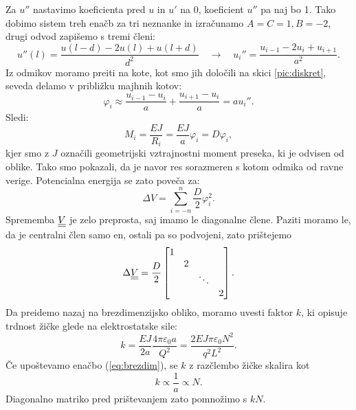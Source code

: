 \documentclass{article}
\begin{document}
Za $u''$ nastavimo koeficienta pred $u$ in $u'$ na 0, koeficient $u''$ pa naj bo 1. Tako dobimo sistem treh enačb za tri neznanke in izračunamo $A=C=1, B=-2$, drugi odvod zapišemo s tremi členi:
\begin{equation}
    u''(l)=\frac{u(l-d)-2u(l)+u(l+d)}{d^2}\quad\rightarrow\quad u_i''=\frac{u_{i-1}-2u_i+u_{i+1}}{a^2}.
\end{equation}
Iz odmikov moramo preiti na kote, kot smo jih določili na skici \ref{pic:diskret}, seveda delamo v približku majhnih kotov:
\begin{equation}
    \varphi_i\approx \frac{u_{i-1}-u_i}{a}+\frac{u_{i+1}-u_i}{a}=au_i''.
    \label{eq:ang_def}
\end{equation}
Sledi:
\begin{equation}
    M_i=\frac{EJ}{R_i}=\frac{EJ}{a}\varphi_i=D\varphi_i,
\end{equation}
kjer smo z $J$ označili geometrijski vztrajnostni moment preseka, ki je odvisen od oblike. Tako smo pokazali, da je navor res sorazmeren s kotom odmika od ravne verige. Potencialna energija se zato poveča za:
\begin{equation}
    \Delta V=\sum_{i=-n}^n\frac{D}{2}\varphi_i^2.
\end{equation}
Sprememba $\underline{\underline{V}}$ je zelo preprosta, saj imamo le diagonalne člene. Paziti moramo le, da je centralni člen samo en, ostali pa so podvojeni, zato prištejemo
\begin{equation}
    \Delta\underline{\underline{V}}=\frac{D}{2}\begin{bmatrix}
        1 & & & \\
        & 2 & & \\
        & & \ddots & \\
        & & & 2
    \end{bmatrix}.
\end{equation}
Da preidemo nazaj na brezdimenzijsko obliko, moramo uvesti faktor $k$, ki opisuje trdnost žičke glede na elektrostatske sile:
\begin{equation}
    k=\frac{EJ}{2a}\frac{4\pi\varepsilon_0a}{Q^2}=\frac{2EJ\pi\varepsilon_0N^2}{q^2L^2}.
\end{equation}
Če upoštevamo enačbo (\ref{eq:brezdim}), se $k$ z razčlembo žičke skalira kot
\begin{equation}
    k\propto\frac{1}{a}\propto N.
\end{equation}
Diagonalno matriko pred prištevanjem zato pomnožimo s $kN$.
\end{document}
